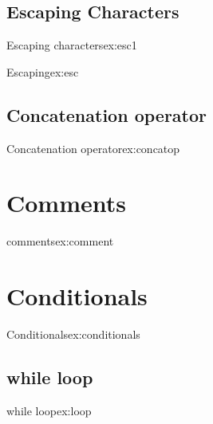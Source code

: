\subsection{Escaping Characters}

\begin{texexample}{Escaping characters}{ex:esc1}
\ttfamily {}
\end{texexample}


\begin{texexample}{Escaping}{ex:esc}
\ttfamily {}
\end{texexample}

\subsection{Concatenation operator}

\begin{texexample}{Concatenation operator}{ex:concatop}
\ttfamily {}
\end{texexample}

\section{Comments}
\begin{texexample}{comments}{ex:comment}
\ttfamily {}
\end{texexample}

\section{Conditionals}
\begin{texexample}{Conditionals}{ex:conditionals}
\end{texexample}

\subsection{while loop}

\begin{texexample}{while loop}{ex:loop}
\end{texexample}

